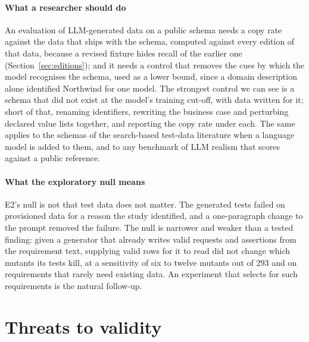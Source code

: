\documentclass[preprint,12pt]{elsarticle}
\begin{document}
\paragraph{What a researcher should do} An evaluation of LLM-generated data on a public schema needs a copy rate against the data that ships with the schema, computed against every edition of that data, because a revised fixture hides recall of the earlier one (Section~\ref{sec:editions}); and it needs a control that removes the cues by which the model recognises the schema, used as a lower bound, since a domain description alone identified Northwind for one model. The strongest control we can see is a schema that did not exist at the model's training cut-off, with data written for it; short of that, renaming identifiers, rewriting the business case and perturbing declared value lists together, and reporting the copy rate under each. The same applies to the schemas of the search-based test-data literature when a language model is added to them, and to any benchmark of LLM realism that scores against a public reference.

\paragraph{What the exploratory null means} E2's null is not that test data does not matter. The generated tests failed on provisioned data for a reason the study identified, and a one-paragraph change to the prompt removed the failure. The null is narrower and weaker than a tested finding: given a generator that already writes valid requests and assertions from the requirement text, supplying valid rows for it to read did not change which mutants its tests kill, at a sensitivity of six to twelve mutants out of 293 and on requirements that rarely need existing data. An experiment that selects for such requirements is the natural follow-up.

\section{Threats to validity}
\label{sec:threats}
\end{document}

